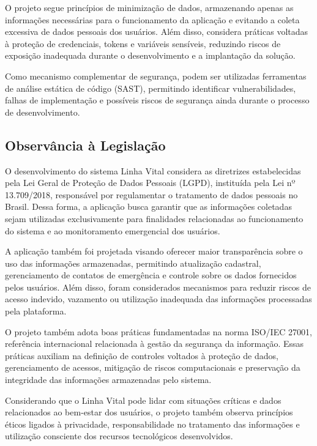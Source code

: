 O projeto segue princípios de minimização de dados, armazenando apenas as informações necessárias para o funcionamento da aplicação e evitando a coleta excessiva de dados pessoais dos usuários. Além disso, considera práticas voltadas à proteção de credenciais, tokens e variáveis sensíveis, reduzindo riscos de exposição inadequada durante o desenvolvimento e a implantação da solução.

Como mecanismo complementar de segurança, podem ser utilizadas ferramentas de análise estática de código (SAST), permitindo identificar vulnerabilidades, falhas de implementação e possíveis riscos de segurança ainda durante o processo de desenvolvimento.

\subsection{Observância à Legislação}

O desenvolvimento do sistema Linha Vital considera as diretrizes estabelecidas pela Lei Geral de Proteção de Dados Pessoais (LGPD), instituída pela Lei nº 13.709/2018, responsável por regulamentar o tratamento de dados pessoais no Brasil. Dessa forma, a aplicação busca garantir que as informações coletadas sejam utilizadas exclusivamente para finalidades relacionadas ao funcionamento do sistema e ao monitoramento emergencial dos usuários.

A aplicação também foi projetada visando oferecer maior transparência sobre o uso das informações armazenadas, permitindo atualização cadastral, gerenciamento de contatos de emergência e controle sobre os dados fornecidos pelos usuários. Além disso, foram considerados mecanismos para reduzir riscos de acesso indevido, vazamento ou utilização inadequada das informações processadas pela plataforma.

O projeto também adota boas práticas fundamentadas na norma ISO/IEC 27001, referência internacional relacionada à gestão da segurança da informação. Essas práticas auxiliam na definição de controles voltados à proteção de dados, gerenciamento de acessos, mitigação de riscos computacionais e preservação da integridade das informações armazenadas pelo sistema.

Considerando que o Linha Vital pode lidar com situações críticas e dados relacionados ao bem-estar dos usuários, o projeto também observa princípios éticos ligados à privacidade, responsabilidade no tratamento das informações e utilização consciente dos recursos tecnológicos desenvolvidos.

